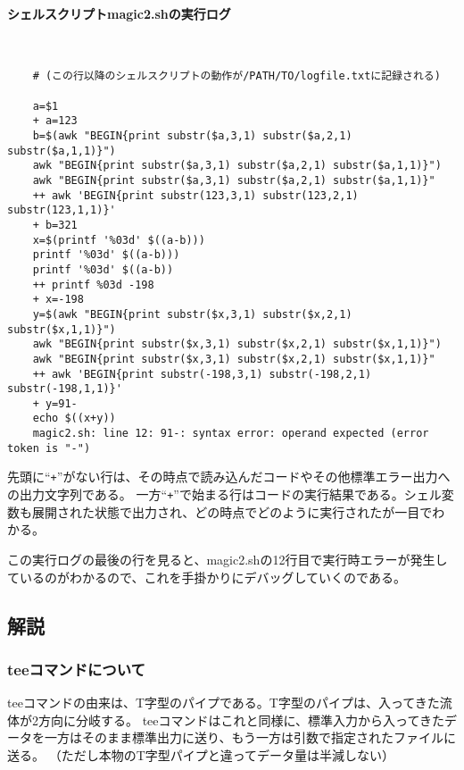 \paragraph{シェルスクリプトmagic2.shの実行ログ} 　\\
\begin{frameboxit}{160.0mm}
\begin{verbatim}
	# (この行以降のシェルスクリプトの動作が/PATH/TO/logfile.txtに記録される)

	a=$1
	+ a=123
	b=$(awk "BEGIN{print substr($a,3,1) substr($a,2,1) substr($a,1,1)}")
	awk "BEGIN{print substr($a,3,1) substr($a,2,1) substr($a,1,1)}")
	awk "BEGIN{print substr($a,3,1) substr($a,2,1) substr($a,1,1)}"
	++ awk 'BEGIN{print substr(123,3,1) substr(123,2,1) substr(123,1,1)}'
	+ b=321
	x=$(printf '%03d' $((a-b)))
	printf '%03d' $((a-b)))
	printf '%03d' $((a-b))
	++ printf %03d -198
	+ x=-198
	y=$(awk "BEGIN{print substr($x,3,1) substr($x,2,1) substr($x,1,1)}")
	awk "BEGIN{print substr($x,3,1) substr($x,2,1) substr($x,1,1)}")
	awk "BEGIN{print substr($x,3,1) substr($x,2,1) substr($x,1,1)}"
	++ awk 'BEGIN{print substr(-198,3,1) substr(-198,2,1) substr(-198,1,1)}'
	+ y=91-
	echo $((x+y))
	magic2.sh: line 12: 91-: syntax error: operand expected (error token is "-")
\end{verbatim}
\end{frameboxit}
先頭に``\verb|+|''がない行は、その時点で読み込んだコードやその他標準エラー出力への出力文字列である。
一方``\verb|+|''で始まる行はコードの実行結果である。シェル変数も展開された状態で出力され、どの時点でどのように実行されたが一目でわかる。

この実行ログの最後の行を見ると、magic2.shの12行目で実行時エラーが発生しているのがわかるので、これを手掛かりにデバッグしていくのである。


\subsection*{解説}

\subsubsection*{teeコマンドについて}

teeコマンドの由来は、T字型のパイプである。T字型のパイプは、入ってきた流体が2方向に分岐する。
teeコマンドはこれと同様に、標準入力から入ってきたデータを一方はそのまま標準出力に送り、もう一方は引数で指定されたファイルに送る。
（ただし本物のT字型パイプと違ってデータ量は半減しない）

